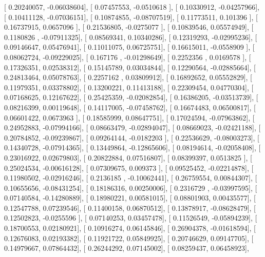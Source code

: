 \documentclass{article}
\begin{document}
       [ 0.20240057, -0.06038604],
       [ 0.07457553, -0.0510618 ],
       [ 0.10330912, -0.04257966],
       [ 0.10411128, -0.07036151],
       [ 0.10874855, -0.08707519],
       [ 0.11773511,  0.101396  ],
       [ 0.16737915,  0.0657096 ],
       [ 0.21536805, -0.0275077 ],
       [ 0.10839546,  0.05574949],
       [ 0.1180826 , -0.07911325],
       [ 0.08569341,  0.10340286],
       [ 0.12319293, -0.02995236],
       [ 0.09146647,  0.05476941],
       [ 0.11011075,  0.06725751],
       [ 0.16615011, -0.0558909 ],
       [ 0.08062724, -0.09229025],
       [ 0.167176  , -0.01298649],
       [ 0.2252356 ,  0.0169578 ],
       [ 0.17326351,  0.02538312],
       [ 0.15145789,  0.03034844],
       [ 0.12290564, -0.02885664],
       [ 0.24813464,  0.05078763],
       [ 0.2257162 ,  0.03809912],
       [ 0.16892652,  0.05552829],
       [ 0.11979351,  0.03378802],
       [ 0.13200221,  0.11413188],
       [ 0.22309454,  0.04770304],
       [ 0.07168625,  0.12167622],
       [ 0.25425359, -0.02082854],
       [ 0.16386205, -0.03513739],
       [ 0.08216399,  0.00119648],
       [ 0.14117005, -0.07458762],
       [ 0.16674483,  0.06500817],
       [ 0.06601422,  0.0673963 ],
       [ 0.18585999,  0.08647751],
       [ 0.17024594, -0.07963862],
       [ 0.24952883, -0.07994166],
       [ 0.08663479, -0.02894047],
       [ 0.08669023, -0.02421188],
       [ 0.20784852, -0.09239867],
       [ 0.09264144, -0.0182203 ],
       [ 0.22536629, -0.08003273],
       [ 0.14340728, -0.07914365],
       [ 0.13449864, -0.12865606],
       [ 0.08194614, -0.02058408],
       [ 0.23016922,  0.02679803],
       [ 0.20822884,  0.07516807],
       [ 0.08399397,  0.0513825 ],
       [ 0.25024534, -0.00616128],
       [ 0.07309675,  0.009373  ],
       [ 0.09525452, -0.02214878],
       [ 0.11980502, -0.02916246],
       [ 0.2136185 , -0.10062441],
       [ 0.26759554,  0.00844307],
       [ 0.10655656, -0.08431254],
       [ 0.18186316,  0.00250006],
       [ 0.2316729 , -0.03997595],
       [ 0.07140584, -0.14280889],
       [ 0.18980221,  0.00581015],
       [ 0.08801903,  0.00435577],
       [ 0.12547788,  0.07239546],
       [ 0.11400158,  0.06870512],
       [ 0.13878917, -0.08628479],
       [ 0.12502823, -0.0255596 ],
       [ 0.07140253,  0.03457478],
       [ 0.11526549, -0.05894239],
       [ 0.18700553,  0.02180921],
       [ 0.10916274,  0.06145846],
       [ 0.26904378, -0.01618594],
       [ 0.12676083,  0.02193382],
       [ 0.11921722,  0.05849925],
       [ 0.20746629,  0.09147705],
       [ 0.14979667,  0.07864432],
       [ 0.26244292,  0.07145002],
       [ 0.08259437,  0.06458923],
\end{document}
